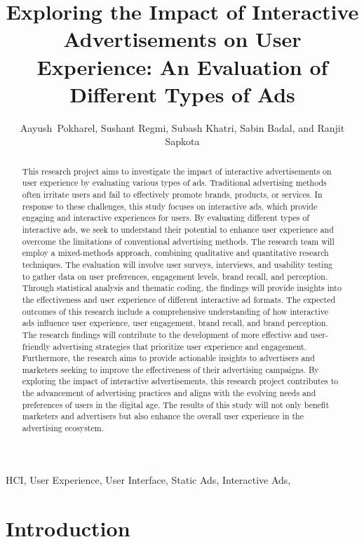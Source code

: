 \documentclass[journal]{IEEEtran}
\title{Exploring the Impact of Interactive Advertisements on User Experience: An Evaluation of Different Types of  Ads}
\author{Aayush~Pokharel,
Sushant Regmi,
Subash Khatri,
    Sabin Badal,
    and Ranjit Sapkota}
\begin{document}
\maketitle

\begin{abstract}
    This research project aims to investigate the impact of interactive
    advertisements on user experience by evaluating various types of ads.
    Traditional advertising methods often irritate users and fail to
    effectively promote brands, products, or services. In response to
    these challenges, this study focuses on interactive ads, which provide
    engaging and interactive experiences for users. By evaluating different
    types of interactive ads, we seek to understand their potential to
    enhance user experience and overcome the limitations of conventional
    advertising methods. The research team will employ a mixed-methods
    approach, combining qualitative and quantitative research techniques.
    The evaluation will involve user surveys, interviews, and usability
    testing to gather data on user preferences, engagement levels, brand
    recall, and perception. Through statistical analysis and thematic coding,
    the findings will provide insights into the effectiveness and user
    experience of different interactive ad formats. The expected outcomes of
    this research include a comprehensive understanding of how interactive ads
    influence user experience, user engagement, brand recall, and brand perception.
    The research findings will contribute to the development of more effective
    and user-friendly advertising strategies that prioritize user experience
    and engagement. Furthermore, the research aims to provide actionable insights
    to advertisers and marketers seeking to improve the effectiveness of their
    advertising campaigns. By exploring the impact of interactive advertisements,
    this research project contributes to the advancement of advertising practices
    and aligns with the evolving needs and preferences of users in the digital age.
    The results of this study will not only benefit marketers and advertisers but
    also enhance the overall user experience in the advertising ecosystem.
\end{abstract}

\begin{IEEEkeywords}
    HCI, User Experience, User Interface, Static Ads, Interactive Ads,
\end{IEEEkeywords}

\section{Introduction}
\end{document}
